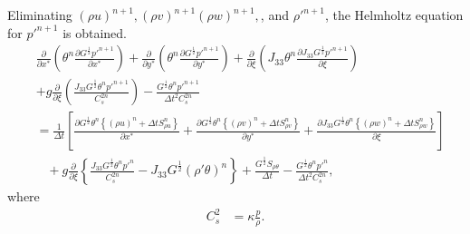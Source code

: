 Eliminating $(\rho u)^{n+1}, (\rho v)^{n+1} (\rho w)^{n+1}, $, and $\rho'^{n+1}$, the Helmholtz equation for $p'^{n+1}$ is obtained.
\begin{align}
  & \frac{\partial}{\partial x^*}\left(\theta^n\frac{\partial G^{\frac{1}{2}}p'^{n+1}}{\partial x^*}\right)
  + \frac{\partial}{\partial y^*}\left(\theta^n\frac{\partial G^{\frac{1}{2}}p'^{n+1}}{\partial y^*}\right)
  + \frac{\partial}{\partial \xi}\left(J_{33}\theta^n\frac{\partial J_{33}G^{\frac{1}{2}}p'^{n+1}}{\partial \xi}\right) \nonumber\\&
  + g \frac{\partial}{\partial \xi} \left(\frac{J_{33}G^{\frac{1}{2}}\theta^np'^{n+1}}{C_s^{2n}}\right)
  - \frac{G^{\frac{1}{2}}\theta^np'^{n+1}}{\Delta t^2 C_s^{2n}} \nonumber\\
  &=
  \frac{1}{\Delta t}\left[
      \frac{\partial G^{\frac{1}{2}}\theta^n\left\{(\rho u)^n + \Delta t S_{\rho u}^n\right\}}{\partial x^*}
    + \frac{\partial G^{\frac{1}{2}}\theta^n\left\{(\rho v)^n + \Delta t S_{\rho v}^n\right\}}{\partial y^*}
    + \frac{\partial J_{33}G^{\frac{1}{2}}\theta^n\left\{(\rho w)^n + \Delta t S_{\rho w}^n\right\}}{\partial \xi}
    \right] \nonumber\\&\;\;\;
  + g \frac{\partial}{\partial \xi}\left\{\frac{J_{33}G^{\frac{1}{2}}\theta^np'^n}{C_s^{2n}}-J_{33}G^{\frac{1}{2}}(\rho'\theta)^n\right\}
  + \frac{G^{\frac{1}{2}} S_{\rho\theta}}{\Delta t}
  - \frac{G^{\frac{1}{2}}\theta^np'^n}{\Delta t^2 C_s^{2n}},
\end{align}
where
\begin{align}
  C_s^2 &= \kappa\frac{p}{\rho}.
\end{align}

